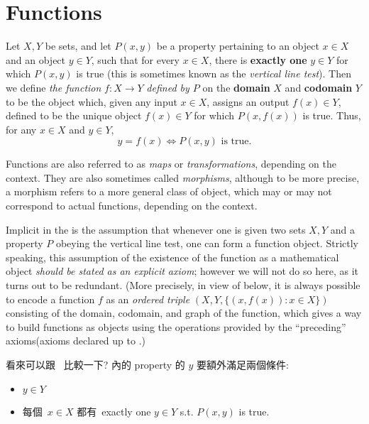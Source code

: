 \section{Functions} \label{sec 3.3}

\begin{definition} [Functions] \label{def 3.3.1}
Let \(X, Y\) be sets, and let \(P(x, y)\) be a property pertaining to an object \(x \in X\) and an object \(y \in Y\), such that for every \(x \in X\), there is \textbf{exactly one} \(y \in Y\) for which \(P(x, y)\) is true (this is sometimes known as the \emph{vertical line test}).
Then we define \emph{the function} \(f : X \rightarrow Y\) \emph{defined by \(P\)} on the \textbf{domain} \(X\) and \textbf{codomain} \(Y\) to be the object which, given any input \(x \in X\), assigns an output \(f(x) \in Y\), defined to be the unique object \(f(x) \in Y\) for which \(P(x, f(x))\) is true. Thus, for any \(x \in X\) and \(y \in Y\),
\[
    y = f(x) \iff P(x, y) \text{ is true}.
\]
\end{definition}

\begin{note}
Functions are also referred to as \emph{maps} or \emph{transformations}, depending on the context.
They are also sometimes called \emph{morphisms}, although to be more precise, a morphism refers to a more general class of object, which may or may not correspond to actual functions, depending on the context.

Implicit in the  is the assumption that whenever one is given two sets \(X, Y\) and a property \(P\) obeying the vertical line test, one can form a function object.
Strictly speaking, this assumption of the existence of the function as a mathematical object \emph{should be stated as an explicit axiom};
however we will not do so here, as it turns out to be redundant.
(More precisely, in view of  below, it is always possible to encode a function \(f\) as an \emph{ordered triple} \((X, Y, \{ (x,f(x)): x \in X \})\) consisting of the domain, codomain, and graph of the function, which gives a way to build functions as objects using the operations provided by the ``preceding'' axioms(axioms declared up to .)
\end{note}

\begin{note}
 看來可以跟\  比較一下?  內的 property 的 \(y\) 要額外滿足兩個條件:
\begin{itemize}
    \item \(y \in Y\)
    \item 每個\ \(x \in X\) 都有\ exactly one \(y \in Y\) s.t. \(P(x, y)\) is true.
\end{itemize}
\end{note}

